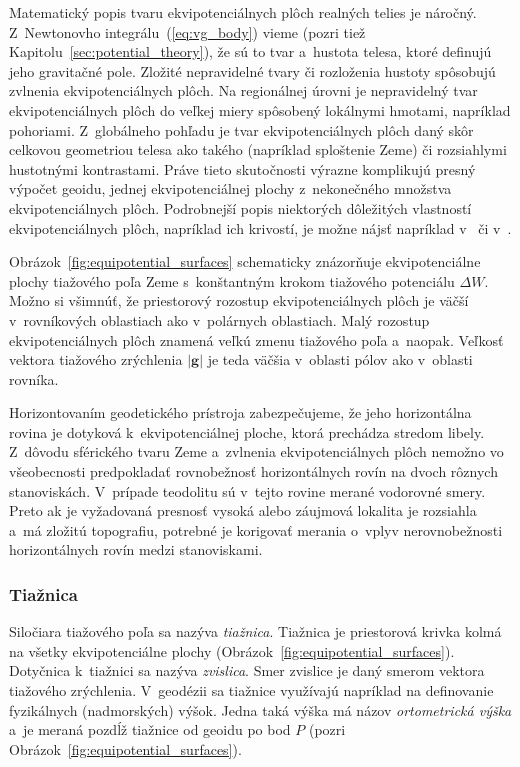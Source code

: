 \documentclass[a4paper, 12pt]{book}
\let\vec\mathbf
\begin{document}
Matematický popis tvaru ekvipotenciálnych plôch realných telies je náročný.
Z~Newtonovho integrálu~(\ref{eq:vg_body}) vieme (pozri tiež
Kapitolu~\ref{sec:potential_theory}), že sú to tvar a~hustota telesa, ktoré
definujú jeho gravitačné pole.  Zložité nepravidelné tvary či rozloženia
hustoty spôsobujú zvlnenia ekvipotenciálnych plôch.  Na regionálnej úrovni je
nepravidelný tvar ekvipotenciálnych plôch do veľkej miery spôsobený lokálnymi
hmotami, napríklad pohoriami.  Z~globálneho pohľadu je tvar ekvipotenciálnych
plôch daný skôr celkovou geometriou telesa ako takého (napríklad sploštenie
Zeme) či rozsiahlymi hustotnými kontrastami.  Práve tieto skutočnosti výrazne
komplikujú presný výpočet geoidu, jednej ekvipotenciálnej plochy z~nekonečného
množstva ekvipotenciálnych plôch.  Podrobnejší popis niektorých dôležitých
vlastností ekvipotenciálnych plôch, napríklad ich krivostí, je možne nájsť
napríklad v~\cite{Janak2006} či v~\cite{MoritzPhysicalGeodesy}.

Obrázok~\ref{fig:equipotential_surfaces} schematicky znázorňuje ekvipotenciálne
plochy tiažového poľa Zeme s~konštantným krokom tiažového potenciálu $\Delta
W$.  Možno si všimnúť, že priestorový rozostup ekvipotenciálnych plôch je väčší
v~rovníkových oblastiach ako v~polárnych oblastiach.  Malý rozostup
ekvipotenciálnych plôch znamená veľkú zmenu tiažového poľa a~naopak.  Veľkosť
vektora tiažového zrýchlenia $| \vec g |$ je teda väčšia v~oblasti pólov ako
v~oblasti rovníka.

Horizontovaním geodetického prístroja zabezpečujeme, že jeho horizontálna
rovina je dotyková k~ekvipotenciálnej ploche, ktorá prechádza stredom libely.
Z~dôvodu sférického tvaru Zeme a~zvlnenia ekvipotenciálnych plôch nemožno vo
všeobecnosti predpokladať rovnobežnosť horizontálnych rovín na dvoch rôznych
stanoviskách.  V~prípade teodolitu sú v~tejto rovine merané vodorovné smery.
Preto ak je vyžadovaná presnosť vysoká alebo záujmová lokalita je rozsiahla
a~má zložitú topografiu, potrebné je korigovať merania o~vplyv nerovnobežnosti
horizontálnych rovín medzi stanoviskami.

\subsubsection{Tiažnica}

Siločiara tiažového poľa sa nazýva \emph{tiažnica}.  Tiažnica je priestorová
krivka kolmá na všetky ekvipotenciálne plochy
(Obrázok~\ref{fig:equipotential_surfaces}).  Dotyčnica k~tiažnici sa nazýva
\emph{zvislica}.  Smer zvislice je daný smerom vektora tiažového zrýchlenia.
V~geodézii sa tiažnice využívajú napríklad na definovanie fyzikálnych
(nadmorských) výšok.  Jedna taká výška má názov \emph{ortometrická výška} a~je
meraná pozdĺž tiažnice od geoidu po bod $P$ (pozri
Obrázok~\ref{fig:equipotential_surfaces}).
\end{document}

